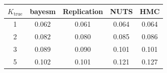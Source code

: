 \begin{tabular}{ccccc}
\toprule
$K_{\text{true}}$ & bayesm & Replication & NUTS & HMC \\
\midrule
1 & 0.062 & 0.061 & 0.064 & 0.064 \\
2 & 0.082 & 0.080 & 0.085 & 0.086 \\
3 & 0.089 & 0.090 & 0.101 & 0.101 \\
5 & 0.102 & 0.101 & 0.121 & 0.127 \\
\bottomrule
\end{tabular}
